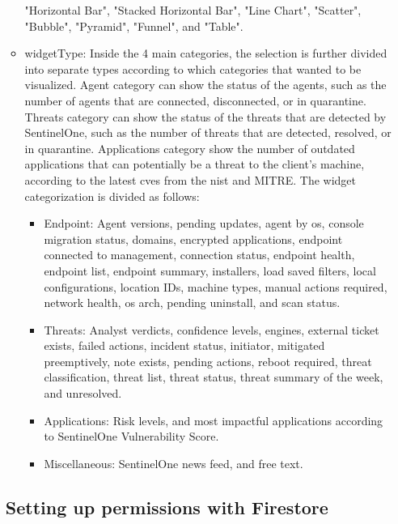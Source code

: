 \begin{multicols}{2}
\begin{itemize}
\begin{itemize}
                  "Horizontal Bar", "Stacked Horizontal Bar", "Line Chart", "Scatter", "Bubble", "Pyramid", "Funnel", and "Table".
            \item widgetType: Inside the 4 main categories, the selection is further divided into separate types according to which
                  categories that wanted to be visualized. Agent category can show the status of the agents, such as the number of agents
                  that are connected, disconnected, or in quarantine. Threats category can show the status of the threats that are
                  detected by SentinelOne, such as the number of threats that are detected, resolved, or in quarantine. Applications
                  category show the number of outdated applications that can potentially be a threat to the client's machine, according
                  to the latest \acrshort{cve}s from the \acrshort{nist} and MITRE. The widget categorization is divided as follows:
                  \begin{itemize}
                    \item Endpoint: Agent versions, pending updates, agent by \acrshort{os}, console migration status, domains,
                          encrypted applications, endpoint connected to management, connection status, endpoint health, endpoint list,
                          endpoint summary, installers, load saved filters, local configurations, location IDs, machine types, manual
                          actions required, network health, \acrshort{os} arch, pending uninstall, and scan status.
                    \item Threats: Analyst verdicts, confidence levels, engines, external ticket exists, failed actions, incident status,
                          initiator, mitigated preemptively, note exists, pending actions, reboot required, threat classification,
                          threat list, threat status, threat summary of the week, and unresolved.
                    \item Applications: Risk levels, and most impactful applications according to SentinelOne Vulnerability Score.
                    \item Miscellaneous: SentinelOne news feed, and free text.
                  \end{itemize}
          \end{itemize}

          \subsection{Setting up permissions with Firestore}


\end{itemize}
\end{multicols}
